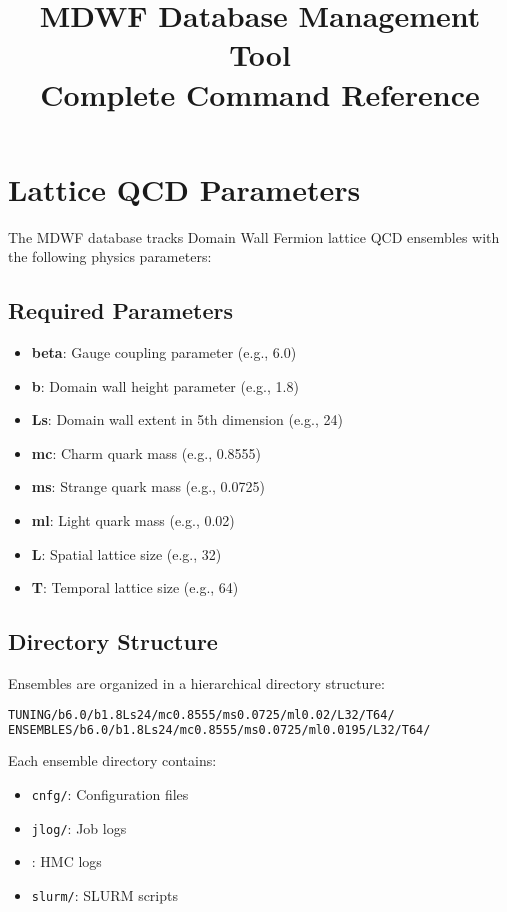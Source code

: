\documentclass{article}
\title{MDWF Database Management Tool\\Complete Command Reference}
\author{}
\date{}
\newcommand{\code}[1]{\texttt{\detokenize{#1}}}
\begin{document}
\maketitle

\tableofcontents
\newpage

\section{Lattice QCD Parameters}

The MDWF database tracks Domain Wall Fermion lattice QCD ensembles with the following physics parameters:

\subsection{Required Parameters}

\begin{itemize}
\item \textbf{beta}: Gauge coupling parameter (e.g., 6.0)
\item \textbf{b}: Domain wall height parameter (e.g., 1.8)
\item \textbf{Ls}: Domain wall extent in 5th dimension (e.g., 24)
\item \textbf{mc}: Charm quark mass (e.g., 0.8555)
\item \textbf{ms}: Strange quark mass (e.g., 0.0725)
\item \textbf{ml}: Light quark mass (e.g., 0.02)
\item \textbf{L}: Spatial lattice size (e.g., 32)
\item \textbf{T}: Temporal lattice size (e.g., 64)
\end{itemize}

\subsection{Directory Structure}

Ensembles are organized in a hierarchical directory structure:

\begin{lstlisting}[language=bash, caption=Directory Structure]
TUNING/b6.0/b1.8Ls24/mc0.8555/ms0.0725/ml0.02/L32/T64/
ENSEMBLES/b6.0/b1.8Ls24/mc0.8555/ms0.0725/ml0.0195/L32/T64/
\end{lstlisting}

Each ensemble directory contains:
\begin{itemize}
\item \texttt{cnfg/}: Configuration files
\item \texttt{jlog/}: Job logs
\item \code{log_hmc/}: HMC logs
\item \texttt{slurm/}: SLURM scripts
\end{itemize}
\end{document}
